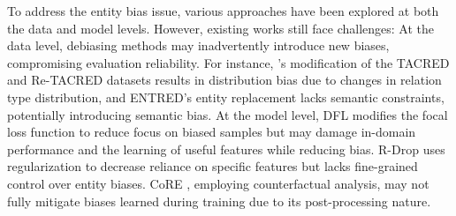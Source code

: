 \documentclass[letterpaper]{article} %
\begin{document}

To address the entity bias issue, various approaches have been explored at both the data and model levels. However, existing works still face challenges: At the data level, debiasing methods may inadvertently introduce new biases, compromising evaluation reliability. For instance, \cite{wang2022should}'s modification of the TACRED and Re-TACRED datasets results in distribution bias due to changes in relation type distribution, and ENTRED's entity replacement \cite{wang2023fragile} lacks semantic constraints, potentially introducing semantic bias. At the model level, DFL \cite{mahabadi2020end} modifies the focal loss function to reduce focus on biased samples but may damage in-domain performance and the learning of useful features while reducing bias. R-Drop \cite{liang2021r} uses regularization to decrease reliance on specific features but lacks fine-grained control over entity biases. CoRE \cite{wang2022should}, employing counterfactual analysis, may not fully mitigate biases learned during training due to its post-processing nature.
\end{document}
